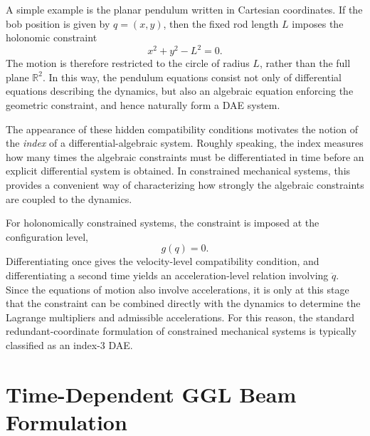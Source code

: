 A simple example is the planar pendulum written in Cartesian coordinates. If
the bob position is given by \(q = (x,y)\), then the fixed rod length \(L\)
imposes the holonomic constraint
\begin{equation*}
    x^2 + y^2 - L^2 = 0.
\end{equation*}
The motion is therefore restricted to the circle of radius \(L\), rather than the full plane \(\mathbb{R}^2\). In this way, the pendulum equations consist not only of differential equations describing the dynamics, but also an algebraic equation enforcing the geometric constraint, and hence naturally form a DAE system.

The appearance of these hidden compatibility conditions motivates the notion of
the \emph{index} of a differential-algebraic system. Roughly speaking, the
index measures how many times the algebraic constraints must be differentiated
in time before an explicit differential system is obtained. In constrained
mechanical systems, this provides a convenient way of characterizing how
strongly the algebraic constraints are coupled to the dynamics.

For holonomically constrained systems, the constraint is imposed at the
configuration level,
\begin{equation*}
    g(q)=0.
\end{equation*}
Differentiating once gives the velocity-level compatibility condition, and differentiating a second time yields an acceleration-level relation involving \(\ddot q\). Since the equations of motion also involve accelerations, it is only at this stage that the constraint can be combined directly with the dynamics to determine the Lagrange multipliers and admissible accelerations. For this reason, the standard redundant-coordinate formulation of constrained mechanical systems is typically classified as an index-3 DAE.

\section{Time-Dependent GGL Beam Formulation}

